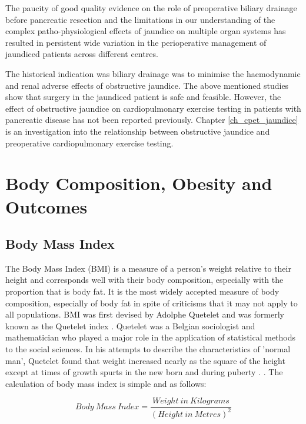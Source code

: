 The paucity of good quality evidence on the role of preoperative biliary drainage before pancreatic resection \parencite{wang_preoperative_2008} and the limitations in our understanding of the complex patho-physiological effects of jaundice on multiple organ systems has resulted in persistent wide variation in the perioperative management of jaundiced patients across different centres.

The historical indication was biliary drainage was to minimise the haemodynamic and renal adverse effects of obstructive jaundice. 
The above mentioned studies show that surgery in the jaundiced patient is safe and feasible. 
However, the effect of obstructive jaundice on cardiopulmonary exercise testing in patients with pancreatic disease has not been reported previously. 
Chapter \ref{ch_cpet_jaundice} is an investigation into the relationship between obstructive jaundice and preoperative cardiopulmonary exercise testing.

\section{Body Composition, Obesity and Outcomes}
\subsection{Body Mass Index}

The Body Mass Index (BMI) is a measure of a person's weight relative to their height and corresponds well with their body composition, especially with the proportion that is body fat. 
It is the most widely accepted measure of body composition, especially of body fat in spite of criticisms that it may not apply to all populations. 
BMI was first devised by Adolphe Quetelet and was formerly known as the Quetelet index \parencite{eknoyan_adolphe_2008}. 
Quetelet was a Belgian sociologist and mathematician who played a major role in the application of statistical methods to the social sciences. 
In his attempts to describe the characteristics of 'normal man', Quetelet found that weight increased nearly as the square of the height except at times of growth spurts in the new born and during puberty \parencite{quetelet_treatise_1842}. . 
The calculation of body mass index is simple and as follows:

\begin{equation} \label{eq:bmi}
Body\ Mass\ Index = \frac{Weight\ in\ Kilograms}{(Height\ in\ Metres)^2}
\end{equation}

